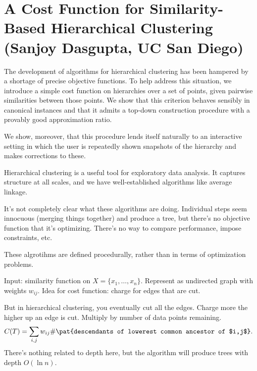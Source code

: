 \section{A Cost Function for Similarity-Based Hierarchical Clustering (Sanjoy Dasgupta, UC San Diego)}

The development of algorithms for hierarchical clustering has been hampered by a shortage of precise objective functions. To help address this situation, we introduce a simple cost function on hierarchies over a set of points, given pairwise similarities between those points. We show that this criterion behaves sensibly in canonical instances and that it admits a top-down construction procedure with a provably good approximation ratio.

We show, moreover, that this procedure lends itself naturally to an interactive setting in which the user is repeatedly shown snapshots of the hierarchy and makes corrections to these.

Hierarchical clustering is a useful tool for exploratory data analysis. It captures structure at all scales, and we have well-established algorithms like average linkage.

It's not completely clear what these algorithms are doing. Individual steps seem innocuous (merging things together) and produce a tree, but there's no objective function that it's optimizing. There's no way to compare performance, impose constraints, etc. 

These algrotihms are defined procedurally, rather than in terms of optimization problems. 

Input: similarity function on $X=\{x_1,\ldots, x_n\}$. Represent as undirected graph with weights $w_{ij}$.
Idea for cost function: charge for edges that are cut.

But in hierarchical clustering, you eventually cut all the edges. Charge more the higher up an edge is cut. 
Multiply by number of data points remaining.
$$
C(T) = \sum_{i,j} w_{ij} \#\pat{descendants of lowerest common ancestor of $i,j$}.
$$
There's nothing related to depth here, but the algorithm will produce trees with depth $O(\ln n)$. 

